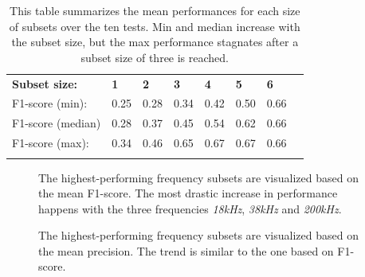\begin{longtable}{llllllll}
\caption[Summary exhaustive search]{This table summarizes the mean performances for each size of subsets over the ten tests. Min and median increase with the subset size, but the max performance stagnates after a subset size of three is reached. }\\
                  &      &      &      &      &      &      &  \\ \hline
\endfirsthead
%
\endhead
%
\hline
\endfoot
%
\endlastfoot
%
\textbf{Subset size:}      & \textbf{1}    & \textbf{2}    & \textbf{3}    & \textbf{4}    & \textbf{5}    & \textbf{6}    &  \\ \hline
F1-score (min):   & 0.25 & 0.28 & 0.34 & 0.42 & 0.50 & 0.66 &  \\
F1-score (median) & 0.28 & 0.37 & 0.45 & 0.54 & 0.62 & 0.66 &  \\
F1-score (max):   & 0.34 & 0.46 & 0.65 & 0.67 & 0.67 & 0.66 &  \\ \hline
\label{summary_per_subset_size_table}

\end{longtable}
    
        
        \begin{figure}[H]
            \centering
            
            \caption[Best frequency combination - F1-score]{The highest-performing frequency subsets are visualized based on the mean F1-score. The most drastic increase in performance happens with the three frequencies \textit{18kHz}, \textit{38kHz} and \textit{200kHz}.}
          	\medskip 
            \label{increasing_freq_f1_score_fig}
        \end{figure}

        \clearpage
        \begin{figure}[H]
            \centering
            
            \caption[Best frequency combination - Precision]{The highest-performing frequency subsets are visualized based on the mean precision. The trend is similar to the one based on F1-score.}
          	\medskip 
            \label{increasing_freq_precision_score_fig}
        \end{figure}
        
